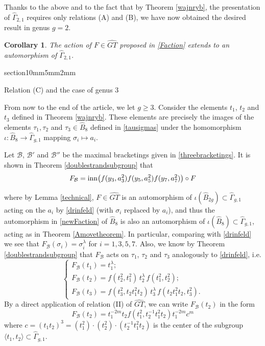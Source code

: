 \documentclass[a4paper,10pt,reqno]{amsart}
\makeatletter
\newcommand\GT{\widehat{GT}}
\newcommand\B{\widehat{B}}
\newcommand\GGone{\widehat{\Gamma}_{g,1}}
\newtheorem{cor}[thm]{Corollary}
\renewcommand{\section}{\@startsection
{section}{1}{0mm}{5mm}{2mm}{\raggedright\bfseries}}
\makeatother
\begin{document}
\vspace{.3cm}
Thanks to the above and to the fact that by Theorem \ref{wajnryb}, the presentation of 
$\widehat\Gamma_{2,1}$ requires only relations (A) and (B), we have now obtained
the desired result in genus $g=2$.

\begin{cor}\label{genus2} The action of $F\in\GT$ proposed in \eqref{Faction}
extends to an automorphism of $\widehat\Gamma_{2,1}$.
\end{cor}

\section{Relation (C) and the case of genus 3}

From now to the end of the article, we let $g\ge 3$. Consider the elements $t_1$, $t_2$ 
and $t_3$ defined in Theorem \ref{wajnryb}. These elements are precisely the images of 
the elements $\tau_1,\tau_2$ and $\tau_3\in \B_8$ defined in \eqref{tausigmas}
under the homomorphism $\iota:\B_8\rightarrow \GGone$ mapping $\sigma_i\mapsto a_i$. 

Let ${\mathcal{B}}$, ${\mathcal{B}'}$ and ${\mathcal{B}''}$  be the maximal bracketings 
given in \eqref{threebracketings}. 
It is shown in Theorem \ref{doublestrandsubgroup} that 
\begin{equation}\label{newFaction}
F_{\mathcal{B}}={\rm inn}\bigl(f(y_3,a_3^2)f(y_5,a_5^2)f(y_7,a_7^2)\bigr)\circ F\\
\end{equation}







where by Lemma \ref{technical}, $F\in \GT$ is an automorphism of $\iota(\B_{2g})\subset \GGone$
acting on the $a_i$ by \eqref{drinfeld} (with $\sigma_i$ replaced by $a_i$), and thus 
the automorphism in \eqref{newFaction} of $\B_8$ is also an automorphism of
$\iota(\B_8)\subset\GGone$, acting as in Theorem \ref{Amovetheorem}. 
In particular, comparing with \eqref{drinfeld} we see that 
$F_{\mathcal{B}}(\sigma_i)=\sigma_i^\lambda$ for $i=1,3,5,7$. Also, we know by Theorem 
\ref{doublestrandsubgroup} that $F_{\mathcal{B}}$ acts on $\tau_1$, 
$\tau_2$ and $\tau_3$ analogously to \eqref{drinfeld}, i.e.
\begin{equation}\label{t1t2t3}
\begin{cases}
F_{\mathcal{B}}(t_1)=t_1^\lambda;
\\
F_{\mathcal{B}}(t_2)=f(t_2^2,t_1^2)\,t_2^\lambda \,f(t_1^2,t_2^2);
\\
F_{\mathcal{B}}(t_3)=f(t_3^2,t_2t_1^2t_2)\,t_3^\lambda \,f(t_2t_1^2t_2,t_3^2).
\end{cases}
\end{equation}
By a direct application of relation (II) of 
$\widehat{GT}$, we can write $F_{\mathcal{B}}(t_2)$ in the form
\begin{equation}\label{FBt2}
F_{\mathcal{B}}(t_2)=t_1^{-2m}t_2f(t_1^2,t_2^{-1}t_1^2t_2)t_1^{-2m}c^m
\end{equation}
where $c=(t_1t_2)^3=(t_1^2)\cdot (t_2^2)\cdot (t_2^{-1}t_1^2t_2)$ is the center of the subgroup 
$\langle t_1,t_2\rangle\subset \GGone$.
\end{document}
